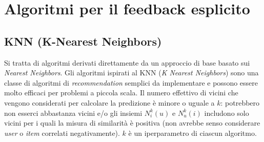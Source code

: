 \section{Algoritmi per il feedback esplicito}\label{algoritmi-per-feedback-esplicito}

\subsection{KNN (K-Nearest Neighbors)}\label{knn}
Si tratta di algoritmi derivati direttamente da un approccio di base basato sui \textit{Nearest Neighbors}. Gli algoritmi ispirati al KNN (\textit{K Nearest Neighbors}) sono una classe di algoritmi di \textit{recommendation} semplici da implementare e possono essere molto efficaci per problemi a piccola scala. Il numero effettivo di vicini che vengono considerati per calcolare la predizione è minore o uguale a $k$: potrebbero non esserci abbastanza vicini e/o gli insiemi $N_i^k(u)$ e $N_u^k(i)$ includono solo vicini per i quali la misura di similarità è positiva (non avrebbe senso considerare \textit{user} o \textit{item} correlati negativamente). $k$ è un iperparametro di ciascun algoritmo.

